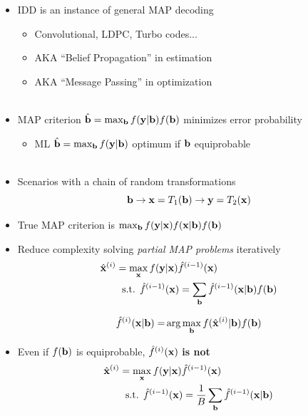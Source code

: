 \documentclass[xcolor=dvipsnames,aspectratio=169]{beamer}
\begin{document}
{    \begin{itemize}
     \item IDD is an instance of general MAP decoding
    \begin{itemize}
        \item Convolutional, LDPC, Turbo codes...
        \item AKA ``Belief Propagation'' in estimation
        \item AKA ``Message Passing'' in optimization\\ \ \\
    \end{itemize}
     \item MAP criterion $\hat{\mathbf{b}}=\max_{\mathbf{b}}f(\mathbf{y}|\mathbf{b})f(\mathbf{b})$ minimizes error probability
        \begin{itemize}
        \item ML $\hat{\mathbf{b}}=\max_{\mathbf{b}}f(\mathbf{y}|\mathbf{b})$ optimum if $\mathbf{b}$ equiprobable\\ \ \\        
        \end{itemize}
        \pagebreak
     \item Scenarios with a chain of random transformations $$\mathbf{b}\to\mathbf{x}=T_1(\mathbf{b})\to\mathbf{y}=T_2(\mathbf{x})$$
     \item True MAP criterion is $\max_{\mathbf{b}} f(\mathbf{y}|\mathbf{x})f(\mathbf{x}|\mathbf{b})f(\mathbf{b})$
     \item Reduce complexity solving \textit{partial MAP problems} iteratively
        \begin{equation}
            \begin{split}
                \hat{\mathbf{x}}^{(i)}&=\max_{\mathbf{x}} f(\mathbf{y}|\mathbf{x})\hat{f}^{(i-1)}(\mathbf{x})\\
                &\;\textnormal{ s.t. } \hat{f}^{(i-1)}(\mathbf{x})=\sum_{\mathbf{b}} \hat{f}^{(i-1)}(\mathbf{x}|\mathbf{b})f(\mathbf{b})
            \end{split}
        \end{equation}

        \begin{equation}
            \begin{split}
                \hat{f}^{(i)}(\mathbf{x}|\mathbf{b})=&\arg\max_{\mathbf{b}} f(\hat{\mathbf{x}}^{(i)}|\mathbf{b})f(\mathbf{b})\\
            \end{split}
        \end{equation}
        
        
     \item Even if $f(\mathbf{b})$ is equiprobable, $\hat{f}^{(i)}(\mathbf{x})$ \textbf{is not}
        \begin{equation}
            \begin{split}
                \hat{\mathbf{x}}^{(i)}&=\max_{\mathbf{x}} f(\mathbf{y}|\mathbf{x})\hat{f}^{(i-1)}(\mathbf{x})\\
                &\;\textnormal{ s.t. } \hat{f}^{(i-1)}(\mathbf{x})=\frac{1}{B}\sum_{\mathbf{b}} \hat{f}^{(i-1)}(\mathbf{x}|\mathbf{b})
            \end{split}
        \end{equation}


\end{itemize}}
\end{document}
